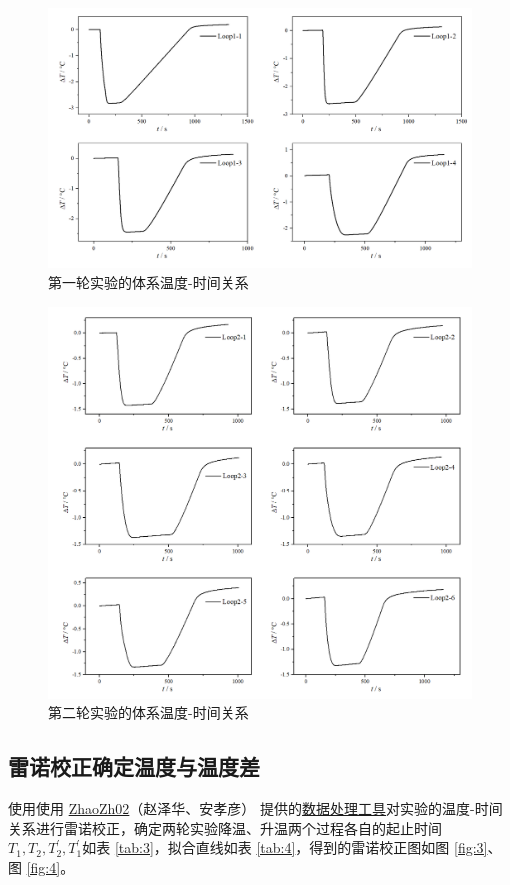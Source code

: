 \documentclass[cn,hazy,pku,12pt,normal,math=newtx,cite=super]{elegantnote}
\begin{document}
\begin{figure}[htbp]
    \centering
    \includegraphics[width=.9\textwidth]{figures/1-1.png}
    \caption{第一轮实验的体系温度-时间关系}
    \label{fig:1}
\end{figure}
\begin{figure}[htbp]
    \centering
    \includegraphics[width=.9\textwidth]{figures/1-2.png}
    \caption{第二轮实验的体系温度-时间关系}
    \label{fig:2}
\end{figure}

\subsection{雷诺校正确定温度与温度差}
使用使用 \href{https://github.com/ZhaoZh02}{ZhaoZh02}（赵泽华、安孝彦） 提供的\href{https://github.com/ZhaoZh02/Dissolution-Combustion}{数据处理工具}对实验的温度-时间关系进行雷诺校正，确定两轮实验降温、升温两个过程各自的起止时间$T_1,T_2,T_2^\prime,T_1^\prime$如表 \ref{tab:3}，拟合直线如表 \ref{tab:4}，得到的雷诺校正图如图 \ref{fig:3}、图 \ref{fig:4}。
\end{document}

